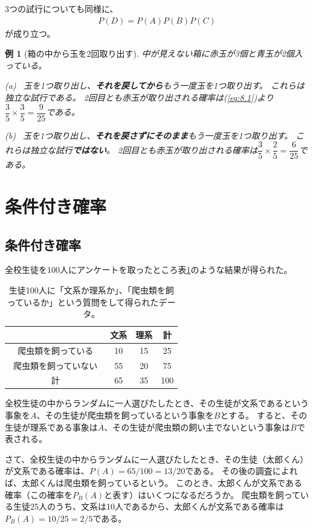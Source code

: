 \documentclass[luatexja,fontsize=12pt]{jlreq}\usepackage{ifthen}\newcounter{enlarge}\setcounter{enlarge}{1}
\newtheorem{eg}{例}
\begin{document}
3つの試行についても同様に、
\begin{align} \label{eq:8.2}
P(D) = P(A) P(B) P(C)
\end{align}
が成り立つ。

\begin{eg}[箱の中から玉を2回取り出す]
中が見えない箱に赤玉が3個と青玉が2個入っている。

(a)~
玉を1つ取り出し、\textbf{それを戻してから}もう一度玉を1つ取り出す。
これらは独立な試行である。
2回目とも赤玉が取り出される確率は(\ref{eq:8.1})より$\dfrac{3}{5} \times \dfrac{3}{5} = \dfrac{9}{25}$である。

(b)~
玉を1つ取り出し、\textbf{それを戻さずにそのまま}もう一度玉を1つ取り出す。
これらは独立な試行\textbf{ではない}。
2回目とも赤玉が取り出される確率は$\dfrac{3}{5} \times \dfrac{2}{5} = \dfrac{6}{25}$である。
\end{eg}

\section{条件付き確率}

\subsection{条件付き確率} \label{ss:10.1}

全校生徒を100人にアンケートを取ったところ表\ref{t:10.1}のような結果が得られた。
\begin{table}[]
\caption{%
生徒100人に「文系か理系か」、「爬虫類を飼っているか」という質問をして得られたデータ。
}
\label{t:10.1}
\centering
\begin{tabular}{c|cc|c} \hline
 & 文系 & 理系 & 計 \\ \hline
爬虫類を飼っている & 10 & 15 & 25 \\
爬虫類を飼っていない　& 55 & 20 & 75 \\ \hline
計 & 65 & 35 & 100 \\ \hline
\end{tabular}    
\end{table}

全校生徒の中からランダムに一人選びたしたとき、その生徒が文系であるという事象を$A$、その生徒が爬虫類を飼っているという事象を$B$とする。
すると、その生徒が理系である事象は$\overline{A}$、その生徒が爬虫類の飼い主でないという事象は$\overline{B}$で表される。

さて、全校生徒の中からランダムに一人選びたしたとき、その生徒（太郎くん）が文系である確率は、$P(A) = 65 / 100 = 13 / 20$である。
その後の調査によれば、太郎くんは爬虫類を飼っているという。
このとき、太郎くんが文系である確率（この確率を$P_B (A)$と表す）はいくつになるだろうか。
爬虫類を飼っている生徒25人のうち、文系は10人であるから、太郎くんが文系である確率は$P_B (A) = 10 / 25 = 2 / 5$である。
\end{document}
